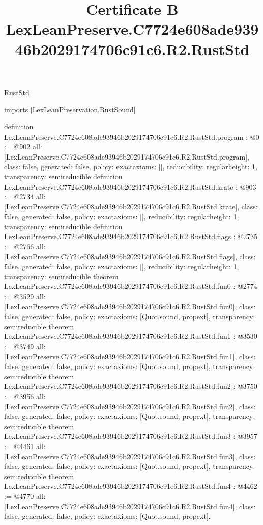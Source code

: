 \begin{lexlean}{RustStd}
\title{Certificate B LexLeanPreserve.C7724e608ade93946b2029174706c91c6.R2.RustStd}
\begin{coremodule}
imports [LexLeanPreservation.RustSound]

definition LexLeanPreserve.C7724e608ade93946b2029174706c91c6.R2.RustStd.program : @0 := @902 {
  all: [LexLeanPreserve.C7724e608ade93946b2029174706c91c6.R2.RustStd.program],
  class: false,
  generated: false,
  policy: exact{axioms: []},
  reducibility: regular{height: 1},
  transparency: semireducible
}
definition LexLeanPreserve.C7724e608ade93946b2029174706c91c6.R2.RustStd.krate : @903 := @2734 {
  all: [LexLeanPreserve.C7724e608ade93946b2029174706c91c6.R2.RustStd.krate],
  class: false,
  generated: false,
  policy: exact{axioms: []},
  reducibility: regular{height: 1},
  transparency: semireducible
}
definition LexLeanPreserve.C7724e608ade93946b2029174706c91c6.R2.RustStd.flags : @2735 := @2766 {
  all: [LexLeanPreserve.C7724e608ade93946b2029174706c91c6.R2.RustStd.flags],
  class: false,
  generated: false,
  policy: exact{axioms: []},
  reducibility: regular{height: 1},
  transparency: semireducible
}
theorem LexLeanPreserve.C7724e608ade93946b2029174706c91c6.R2.RustStd.fun0 : @2774 := @3529 {
  all: [LexLeanPreserve.C7724e608ade93946b2029174706c91c6.R2.RustStd.fun0],
  class: false,
  generated: false,
  policy: exact{axioms: [Quot.sound, propext]},
  transparency: semireducible
}
theorem LexLeanPreserve.C7724e608ade93946b2029174706c91c6.R2.RustStd.fun1 : @3530 := @3749 {
  all: [LexLeanPreserve.C7724e608ade93946b2029174706c91c6.R2.RustStd.fun1],
  class: false,
  generated: false,
  policy: exact{axioms: [Quot.sound, propext]},
  transparency: semireducible
}
theorem LexLeanPreserve.C7724e608ade93946b2029174706c91c6.R2.RustStd.fun2 : @3750 := @3956 {
  all: [LexLeanPreserve.C7724e608ade93946b2029174706c91c6.R2.RustStd.fun2],
  class: false,
  generated: false,
  policy: exact{axioms: [Quot.sound, propext]},
  transparency: semireducible
}
theorem LexLeanPreserve.C7724e608ade93946b2029174706c91c6.R2.RustStd.fun3 : @3957 := @4461 {
  all: [LexLeanPreserve.C7724e608ade93946b2029174706c91c6.R2.RustStd.fun3],
  class: false,
  generated: false,
  policy: exact{axioms: [Quot.sound, propext]},
  transparency: semireducible
}
theorem LexLeanPreserve.C7724e608ade93946b2029174706c91c6.R2.RustStd.fun4 : @4462 := @4770 {
  all: [LexLeanPreserve.C7724e608ade93946b2029174706c91c6.R2.RustStd.fun4],
  class: false,
  generated: false,
  policy: exact{axioms: [Quot.sound, propext]},
}
\end{coremodule}
\end{lexlean}
